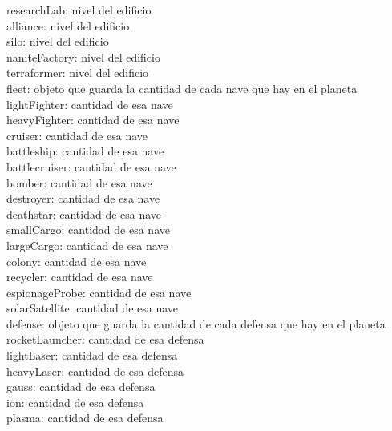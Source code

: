 \documentclass{article}
\newcommand\tab[1][1cm]{\hspace*{#1}}
\begin{document}
            \tab\tab researchLab: nivel del edificio\\
            \tab\tab alliance: nivel del edificio\\
            \tab\tab silo: nivel del edificio\\
            \tab\tab naniteFactory: nivel del edificio\\
            \tab\tab terraformer: nivel del edificio\\
            \tab fleet: objeto que guarda la cantidad de cada nave que hay en el planeta\\
            \tab\tab lightFighter: cantidad de esa nave\\
            \tab\tab heavyFighter: cantidad de esa nave\\
            \tab\tab cruiser: cantidad de esa nave\\
            \tab\tab battleship: cantidad de esa nave\\
            \tab\tab battlecruiser: cantidad de esa nave\\
            \tab\tab bomber: cantidad de esa nave\\
            \tab\tab destroyer: cantidad de esa nave\\
            \tab\tab deathstar: cantidad de esa nave\\
            \tab\tab smallCargo: cantidad de esa nave\\
            \tab\tab largeCargo: cantidad de esa nave\\
            \tab\tab colony: cantidad de esa nave\\
            \tab\tab recycler: cantidad de esa nave\\
            \tab\tab espionageProbe: cantidad de esa nave\\
            \tab\tab solarSatellite: cantidad de esa nave\\
            \tab defense: objeto que guarda la cantidad de cada defensa que hay en el planeta\\
            \tab\tab rocketLauncher: cantidad de esa defensa\\
            \tab\tab lightLaser: cantidad de esa defensa\\
            \tab\tab heavyLaser: cantidad de esa defensa\\
            \tab\tab gauss: cantidad de esa defensa\\
            \tab\tab ion: cantidad de esa defensa\\
            \tab\tab plasma: cantidad de esa defensa\\
\end{document}
